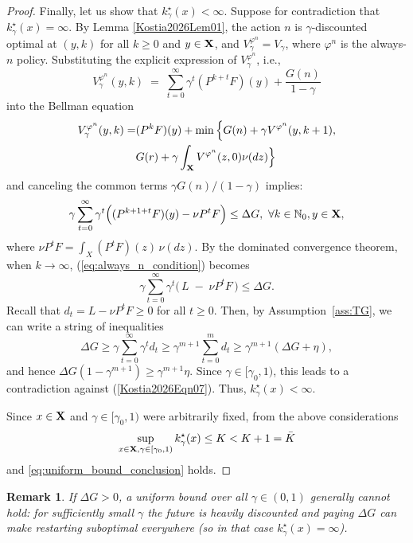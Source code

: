 \documentclass[letterpaper,10pt,conference]{ieeeconf}  %
\newtheorem{remark}{Remark}
\begin{document}
\begin{proof}
{Finally,} let us show that $k^\star_\gamma(x) < \infty$.   
Suppose {for contradiction that}  $k^\star_\gamma(x) = \infty$. {By Lemma \ref{Kostia2026Lem01},} 
the action $n$ is {$\gamma$-discounted} optimal at $({y},k)$ for all {$k\ge 0$ and $y\in{\bf X}$, and $V_\gamma^{\varphi^n}=V_\gamma$, where $\varphi^n$ is the always-$n$ policy.}
Substituting the explicit expression of {$V^{\varphi^n}_\gamma$}, i.e.,
\[
V_\gamma^{{\varphi^n}}({y},k) \; = \; \sum_{t=0}^{\infty}\gamma^{t} (P^{k+t}F)({y}) + \frac{G(n)}{1-\gamma}
\]
into the Bellman equation
{\begin{align*}
V_\gamma^{\varphi^n}(y,k)=&(P^kF)(y)+\min\Big\{G(n)+\gamma V^{\varphi^n}(y,k+1), \\
&G(r)+\gamma \int_{{\bf X}} V^{\varphi^n}(z,0)\nu(dz)  \Big\}
\end{align*}}
and canceling the common terms 
$\gamma G(n)/(1-\gamma)$ implies:
\begin{equation}\label{eq:always_n_condition}
\gamma \sum_{t=0}^{\infty}\gamma^{t}\Big((P^{k+1+t}F)({y})-\nu P^{t}F\Big) \le \Delta G, \
\forall k \in {\mathbb N}_0, y\in {\bf X},
\end{equation}
where $\nu P^{t}F = \int_X (P^{t}F)(z)\,\nu(dz)$. By the dominated convergence theorem,
when $k \to \infty$, (\ref{eq:always_n_condition}) becomes
$$
\gamma \sum_{t=0}^{\infty}\gamma^{t}\Big(\,L\;-\;\nu P^t F\,\Big) \le \Delta G.
$$
{Recall that $d_t = L - \nu P^t F\ge 0$ for all $t\ge 0$}. Then, by  Assumption~\ref{ass:TG},
we can write a string of inequalities
$$
\Delta G \ge \gamma \sum_{t=0}^{\infty}\gamma^{t} d_t 
\ge \gamma^{m+1} \sum_{t=0}^{m} d_t \ge \gamma^{m+1} (\Delta G + \eta),
$$ 
{and hence  $\Delta G (1-\gamma^{m+1})\ge \gamma^{m+1}\eta.$  
Since $\gamma\in [\gamma_0,1)$, this leads to a contradiction  against (\ref{Kostia2026Eqn07}).}
Thus, 
$k^\star_\gamma(x) < \infty$. 

{Since $x\in {\bf X}$ and $\gamma\in[\gamma_0,1)$ were arbitrarily fixed,} from the above considerations 
$$
\sup_{x\in {\bf X},\gamma\in[\gamma_0,1)} k^\star_\gamma(x) \le K < {K+1=\bar{K}}
$$ 
and \eqref{eq:uniform_bound_conclusion} holds.
\end{proof}
\medskip
\begin{remark}
If $\Delta G>0$, a uniform bound over all $\gamma\in(0,1)$ generally cannot hold:
for sufficiently small $\gamma$ the future is heavily discounted and paying $\Delta G$
can make restarting suboptimal everywhere (so in that case $k^\star_\gamma(x)=\infty$).
\end{remark}
\medskip
\end{document}
